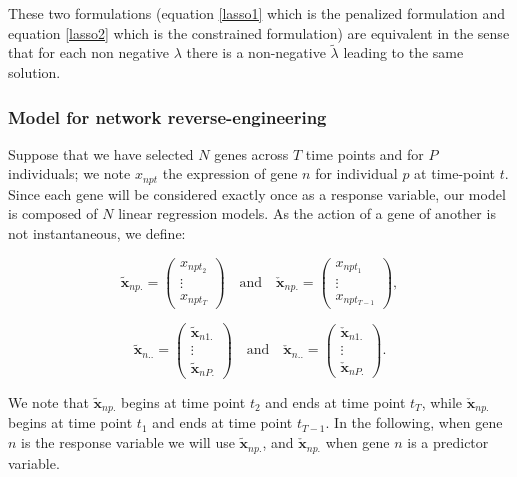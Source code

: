 \documentclass[a4paper]{article}
\begin{document}
These two formulations (equation \eqref{lasso1} which is the penalized formulation and equation \eqref{lasso2} which is the constrained formulation) are equivalent in the sense that for each non negative $\lambda$ there is a non-negative  $\tilde{\lambda}$ leading to the same solution. \\

\subsubsection{Model for network reverse-engineering}

Suppose that we have selected $N$ genes across $T$ time points and for $P$ individuals; we note $x_{npt}$ the expression of gene $n$ for individual $p$ at time-point $t$. 
Since each gene will be considered exactly once as a response variable, our model is composed of $N$ linear regression models. 
As the action of a gene of another is not instantaneous, we define:

$$
\tilde{\boldsymbol{x}}_{np.} = 
\begin{pmatrix}
x_{np{t_2}} \\
\vdots \\
x_{np{t_T}}
\end{pmatrix}
\text{~~~and~~~}
\check{\boldsymbol{x}}_{np.} = 
\begin{pmatrix}
x_{np{t_1}} \\
\vdots \\
x_{np{t_{T-1}}}
\end{pmatrix},
$$

$$
\tilde{\boldsymbol{x}}_{n..} = 
\begin{pmatrix}
\tilde{\boldsymbol{x}}_{n1.}\\
\vdots \\
\tilde{\boldsymbol{x}}_{nP.}
\end{pmatrix}
\text{~~~and~~~}
\check{\boldsymbol{x}}_{n..} = 
\begin{pmatrix}
\check{\boldsymbol{x}}_{n1.} \\
\vdots \\
\check{\boldsymbol{x}}_{nP.}
\end{pmatrix}.
$$

We note that $\tilde{\boldsymbol{x}}_{np.}$ begins at time point $t_2$ and ends at time point $t_T$, 
while  $\check{\boldsymbol{x}}_{np.}$ begins at time point $t_1$ and ends at time point $t_{T-1}$. 
In the following, when gene $n$ is the response variable we will use $\tilde{\boldsymbol{x}}_{np.}$, 
and $\check{\boldsymbol{x}}_{np.}$ when gene $n$ is a predictor variable. \\
\end{document}
